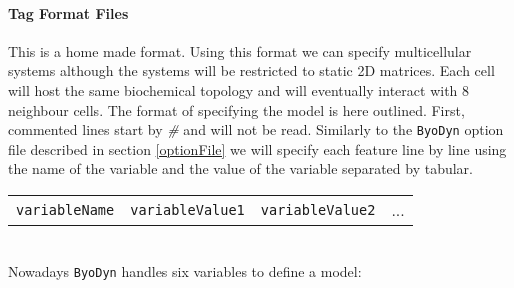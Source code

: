 \documentclass[a4paper, 11pt]{article}
\begin{document}
\paragraph{Tag Format Files}
This is a home made format.
Using this format we can specify multicellular systems although the systems will be restricted to static 2D matrices.
Each cell will host the same biochemical topology and will eventually interact with 8 neighbour cells.
The format of specifying the model is here outlined.
First, commented lines start by \emph{\#} and will not be read.
Similarly to the \texttt{ByoDyn} option file described in section \ref{optionFile} we will specify each feature line by line using the name of the variable and the value of the variable separated by tabular.\\[1.5ex]
\begin{tabular}{cccc}
  \texttt{variableName}&\texttt{variableValue1}&\texttt{variableValue2}&...
\end{tabular}\\[1.5ex]
Nowadays \texttt{ByoDyn} handles six variables to define a model:
\end{document}
